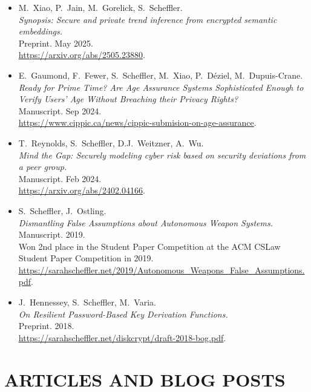 \documentclass{res}
\begin{document}
\begin{resume}
\begin{itemize}
\item[\synopsis] M.~Xiao, P.~Jain, M.~Gorelick, S.~Scheffler. \\
\emph{Synopsis: Secure and private trend inference from encrypted semantic embeddings.} \\
Preprint.  
May 2025. \\
\url{https://arxiv.org/abs/2505.23880}.

\item[\ageVerifPrimeTime] E.~Gaumond, F.~Fewer, S.~Scheffler, M.~Xiao, P.~D\'eziel, M.~Dupuis-Crane. \\
\emph{Ready for Prime Time? Are Age Assurance Systems Sophisticated Enough to Verify Users' Age Without Breaching their Privacy Rights?} \\
Manuscript.  
Sep 2024.  \\
\url{https://www.cippic.ca/news/cippic-submision-on-age-assurance}.

\item[\scramDeviations] T.~Reynolds, S.~Scheffler, D.J.~Weitzner, A.~Wu. \\
\emph{Mind the Gap: Securely modeling cyber risk based on security deviations from a peer group.} \\
Manuscript.  
Feb 2024. \\
\url{https://arxiv.org/abs/2402.04166}.

\item[\autonomousWeapons] S.~Scheffler, J.~Ostling. \\
\emph{Dismantling False Assumptions about Autonomous Weapon Systems.} \\
Manuscript.  
2019. \\
Won 2nd place in the Student Paper Competition at the ACM CSLaw Student Paper Competition in 2019. \\
\url{https://sarahscheffler.net/2019/Autonomous_Weapons_False_Assumptions.pdf}.

\item[\bog] J.~Hennessey, S.~Scheffler, M.~Varia. \\
\emph{On Resilient Password-Based Key Derivation Functions.} \\
Preprint.  
2018. \\
\url{https://sarahscheffler.net/diskcrypt/draft-2018-bog.pdf}.
\end{itemize}




\section{ARTICLES AND BLOG POSTS}  
\vspace{0.1in}


\end{resume}
\end{document}

